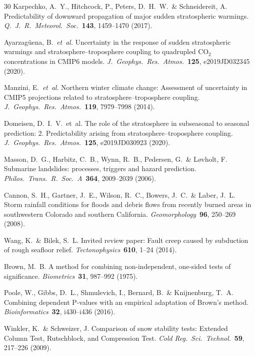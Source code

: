 \documentclass[11pt,letterpaper]{article}
\begin{document}
\begin{thebibliography}{30}
Karpechko, A.~Y., Hitchcock, P., Peters, D.~H.~W.\ \& Schneidereit, A. Predictability of downward propagation of major sudden stratospheric warmings. \textit{Q.\ J.\ R.\ Meteorol.\ Soc.}\ \textbf{143}, 1459--1470 (2017).

Ayarzag\"uena, B.\ \textit{et~al.} Uncertainty in the response of sudden stratospheric warmings and stratosphere--troposphere coupling to quadrupled CO$_2$ concentrations in CMIP6 models. \textit{J.\ Geophys.\ Res.\ Atmos.}\ \textbf{125}, e2019JD032345 (2020).

Manzini, E.\ \textit{et~al.} Northern winter climate change: Assessment of uncertainty in CMIP5 projections related to stratosphere--troposphere coupling. \textit{J.\ Geophys.\ Res.\ Atmos.}\ \textbf{119}, 7979--7998 (2014).

Domeisen, D.~I.~V.\ et~al. The role of the stratosphere in subseasonal to seasonal prediction: 2. Predictability arising from stratosphere--troposphere coupling. \textit{J.\ Geophys.\ Res.\ Atmos.}\ \textbf{125}, e2019JD030923 (2020).

Masson, D.~G., Harbitz, C.~B., Wynn, R.~B., Pedersen, G.\ \& L{\o}vholt, F. Submarine landslides: processes, triggers and hazard prediction. \textit{Philos.\ Trans.\ R.\ Soc.\ A}\ \textbf{364}, 2009--2039 (2006).

Cannon, S.~H., Gartner, J.~E., Wilson, R.~C., Bowers, J.~C.\ \& Laber, J.~L. Storm rainfall conditions for floods and debris flows from recently burned areas in southwestern Colorado and southern California. \textit{Geomorphology}\ \textbf{96}, 250--269 (2008).

Wang, K.\ \& Bilek, S.~L. Invited review paper: Fault creep caused by subduction of rough seafloor relief. \textit{Tectonophysics}\ \textbf{610}, 1--24 (2014).

Brown, M.~B. A method for combining non-independent, one-sided tests of significance. \textit{Biometrics}\ \textbf{31}, 987--992 (1975).

Poole, W., Gibbs, D.~L., Shmulevich, I., Bernard, B.\ \& Knijnenburg, T.~A. Combining dependent P-values with an empirical adaptation of Brown's method. \textit{Bioinformatics}\ \textbf{32}, i430--i436 (2016).

Winkler, K.\ \& Schweizer, J. Comparison of snow stability tests: Extended Column Test, Rutschblock, and Compression Test. \textit{Cold Reg.\ Sci.\ Technol.}\ \textbf{59}, 217--226 (2009).


\end{thebibliography}
\end{document}
